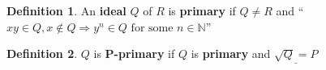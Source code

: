 \documentclass[12pt,a4paper]{article}
\theoremstyle{definition}
\newtheorem{definition}{Definition}[subsection]
\begin{document}
\begin{definition}
  An \textbf{ideal} $Q$ of $R$ is \textbf{primary} if $Q \neq R$ and ``$\boxed{xy \in Q, x \notin Q \Rightarrow y^n \in Q}\text{ for some } n \in \mathbb{N}$''
\end{definition}
\vspace{0.125em}

\begin{definition}
  $Q$ is $\mathbf{P}$\textbf{-primary} if $Q$ is \textbf{primary} and $\underline{\sqrt{Q} = P}$
\end{definition}
\vspace{0.125em}
\end{document}

